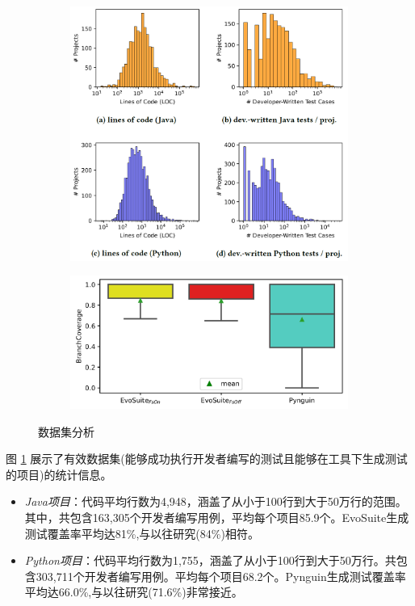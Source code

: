 \documentclass{article}
\begin{document}
\begin{figure}[htbp]
    \centering
    \begin{subfigure}[htbp]{0.45\textwidth}
        \centering
        \includegraphics[width=\textwidth]{img/dataset.png}
    \end{subfigure}
    \begin{subfigure}[htbp]{0.45\textwidth}
        \centering
        \includegraphics[width=\textwidth]{img/dataset_2.png}
    \end{subfigure}
    \caption{数据集分析}
    \label{fig:dataset}
\end{figure}

图 \ref{fig:dataset} 展示了有效数据集(能够成功执行开发者编写的测试且能够在工具下生成测试的项目)的统计信息。

\begin{itemize}
    \item \textit{Java项目}：代码平均行数为4,948，涵盖了从小于100行到大于50万行的范围。其中，共包含163,305个开发者编写用例，平均每个项目85.9个。EvoSuite生成测试覆盖率平均达81\%,与以往研究(84\%)相符。
    \item \textit{Python项目}：代码平均行数为1,755，涵盖了从小于100行到大于50万行。共包含303,711个开发者编写用例。平均每个项目68.2个。Pynguin生成测试覆盖率平均达66.0\%,与以往研究(71.6\%)非常接近。
\end{itemize}
\end{document}
